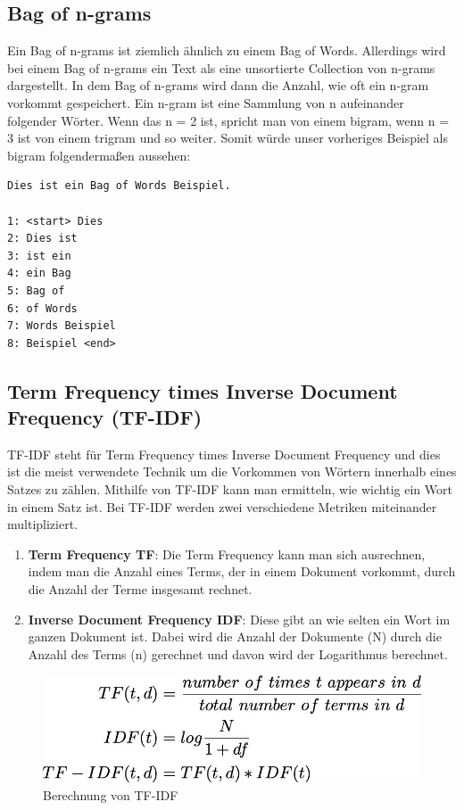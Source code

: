 \subsection{Bag of n-grams}

Ein Bag of n-grams ist ziemlich ähnlich zu einem Bag of Words.
Allerdings wird bei einem Bag of n-grams ein Text als eine unsortierte Collection von n-grams dargestellt.
In dem Bag of n-grams wird dann die Anzahl, wie oft ein n-gram vorkommt gespeichert.
Ein n-gram ist eine Sammlung von n aufeinander folgender Wörter.
Wenn das n = 2 ist, spricht man von einem bigram, wenn n = 3 ist von einem trigram und so weiter.
Somit würde unser vorheriges Beispiel als bigram folgendermaßen aussehen:

\begin{lstlisting}[label={lst: Bag of n-grams Beispiel}]
Dies ist ein Bag of Words Beispiel.

1: <start> Dies
2: Dies ist
3: ist ein
4: ein Bag
5: Bag of
6: of Words
7: Words Beispiel
8: Beispiel <end>
\end{lstlisting}

\subsection{Term Frequency times Inverse Document Frequency (TF-IDF)}

TF-IDF steht für Term Frequency times Inverse Document Frequency und dies ist die meist verwendete Technik um die Vorkommen von Wörtern innerhalb eines Satzes zu zählen.
Mithilfe von TF-IDF kann man ermitteln, wie wichtig ein Wort in einem Satz ist.
Bei TF-IDF werden zwei verschiedene Metriken miteinander multipliziert.\cite{tfIdf}

\begin{enumerate}
    \item \textbf{Term Frequency TF}: Die Term Frequency kann man sich ausrechnen, indem man die Anzahl eines Terms, der in einem Dokument vorkommt, durch die Anzahl der Terme insgesamt rechnet.
    \item \textbf{Inverse Document Frequency IDF}: Diese gibt an wie selten ein Wort im ganzen Dokument ist.
    Dabei wird die Anzahl der Dokumente (N) durch die Anzahl des Terms (n) gerechnet und davon wird der Logarithmus berechnet.
\end{enumerate}

\begin{figure}[hbt!]
    \centering
    \includegraphics[scale=0.35]{pics/tf_idf}
    \caption{Berechnung von TF-IDF~\cite{tfIdfImage}}
    \label{fig:tf-idf}
\end{figure}

